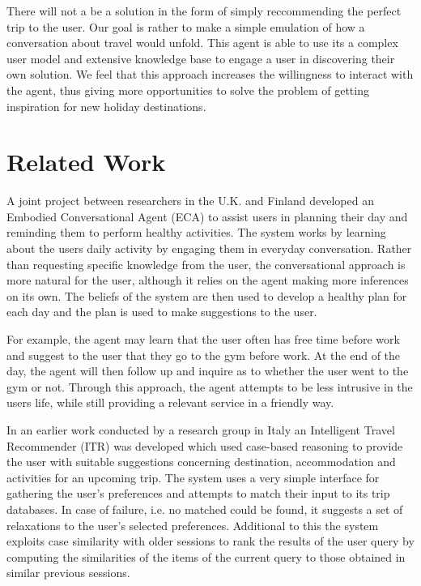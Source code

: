 \documentclass[11pt]{article} %
\begin{document}
There will not a be a solution in the form of simply reccommending the perfect trip to the user. Our goal is rather to make a simple emulation of how a conversation about travel would unfold. This agent is able to use its a complex user model and extensive
knowledge base to engage a user in discovering their own solution.
We feel that this approach increases the willingness to interact
with the agent, thus giving more opportunities to solve the problem of getting inspiration for new holiday destinations.

\section{Related Work}
A joint project between researchers in the U.K. and Finland
developed an Embodied Conversational Agent (ECA) to assist
users in planning their day and reminding them to perform
healthy activities. The system works by learning about the
users daily activity by engaging them in everyday conversation.
Rather than requesting specific knowledge from the user, the
conversational approach is more natural for the user, although
it relies on the agent making more inferences on its own. The
beliefs of the system are then used to develop a healthy plan
for each day and the plan is used to make suggestions to the user.

For example, the agent may learn that the user often has free
time before work and suggest to the user that they go to the
gym before work. At the end of the day, the agent will then
follow up and inquire as to whether the user went to the gym
or not. Through this approach, the agent attempts to be less
intrusive in the users life, while still providing a relevant
service in a friendly way.

In an earlier work conducted by a research group in Italy an
Intelligent Travel Recommender (ITR) was developed which used
case-based reasoning to provide the user with suitable
suggestions concerning destination, accommodation and
activities for an upcoming trip. The system uses a very
simple interface for gathering the user’s preferences and
attempts to match their input to its trip databases. In case
of failure, i.e. no matched could be found, it suggests a set
of relaxations to the user’s selected preferences. Additional
to this the system exploits case similarity with older sessions
to rank the results of the user query by computing the
similarities of the items of the current query to those
obtained in similar previous sessions.
\end{document}
